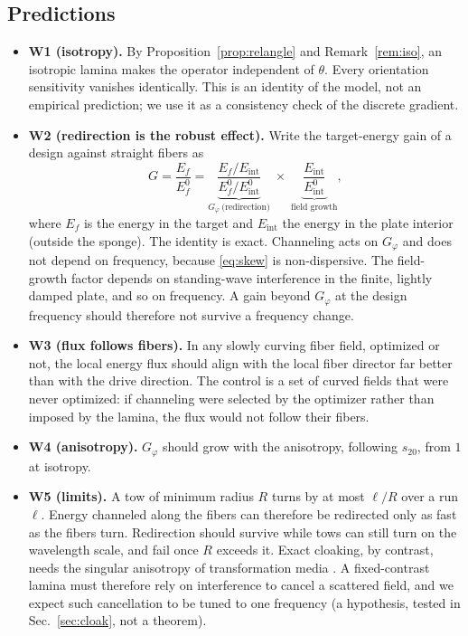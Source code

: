 \subsection{Predictions}\label{sec:predictions}
\begin{itemize}[itemsep=2pt]
\item \textbf{W1 (isotropy).} By Proposition~\ref{prop:relangle} and
Remark~\ref{rem:iso}, an isotropic lamina makes the operator independent of $\theta$.
Every orientation sensitivity vanishes identically. This is an identity of the model,
not an empirical prediction; we use it as a consistency check of the discrete gradient.
\item \textbf{W2 (redirection is the robust effect).} Write the target-energy gain of a
design against straight fibers as
\begin{equation}
G=\frac{E_f}{E_f^0}=\underbrace{\frac{E_f/E_{\mathrm{int}}}{E_f^0/E^0_{\mathrm{int}}}}_{G_\varphi\ \text{(redirection)}}
\;\times\;\underbrace{\frac{E_{\mathrm{int}}}{E^0_{\mathrm{int}}}}_{\text{field growth}},
\label{eq:gainsplit}
\end{equation}
where $E_f$ is the energy in the target and $E_{\mathrm{int}}$ the energy in the plate
interior (outside the sponge). The identity is exact. Channeling acts on
$G_\varphi$ and does not depend on frequency, because \eqref{eq:skew} is
non-dispersive. The field-growth factor depends on standing-wave interference in the
finite, lightly damped plate, and so on frequency. A gain beyond $G_\varphi$ at the
design frequency should therefore not survive a frequency change.
\item \textbf{W3 (flux follows fibers).} In any slowly curving fiber field, optimized or
not, the local energy flux should align with the local fiber director far better than
with the drive direction. The control is a set of curved fields that were never
optimized: if channeling were selected by the optimizer rather than imposed by the
lamina, the flux would not follow their fibers.
\item \textbf{W4 (anisotropy).} $G_\varphi$ should grow with the anisotropy, following
$s_{20}$, from $1$ at isotropy.
\item \textbf{W5 (limits).} A tow of minimum radius $R$ turns by at most $\ell/R$ over a run
$\ell$. Energy channeled along the fibers can therefore be redirected only as fast as
the fibers turn. Redirection should survive while tows can still turn on the
wavelength scale, and fail once $R$ exceeds it. Exact cloaking, by contrast,
needs the singular anisotropy of transformation media \cite{norris2008}. A
fixed-contrast lamina must therefore rely on interference to cancel a scattered field, and
we expect such cancellation to be tuned to one frequency (a hypothesis, tested in
Sec.~\ref{sec:cloak}, not a theorem).
\end{itemize}
